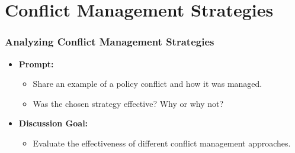 \documentclass[10pt]{beamer}
\begin{document}
            \section{Conflict Management Strategies}
            
            \begin{frame}
            \frametitle{Analyzing Conflict Management Strategies}
            \begin{itemize}
                \item \textbf{Prompt:}
                    \begin{itemize}
                        \item Share an example of a policy conflict and how it was managed.
                        \item Was the chosen strategy effective? Why or why not?
                    \end{itemize}
                \item \textbf{Discussion Goal:}
                    \begin{itemize}
                        \item Evaluate the effectiveness of different conflict management approaches.
                    \end{itemize}
            \end{itemize}
            \end{frame}
            
\end{document}
